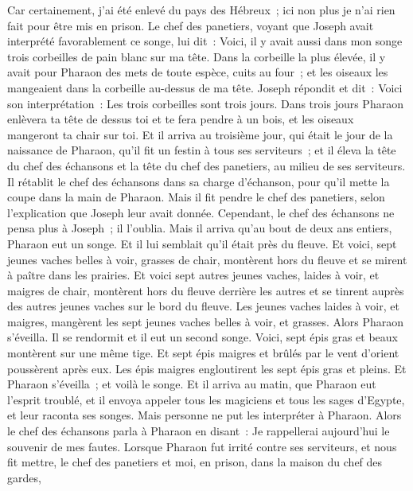 \begin{multicols}{2}
Car certainement, j'ai été enlevé du pays des Hébreux~; ici non plus je n'ai rien fait pour être mis en prison.
Le chef des panetiers, voyant que Joseph avait interprété favorablement ce songe, lui dit~: Voici, il y avait aussi dans mon songe trois corbeilles de pain blanc sur ma tête.
Dans la corbeille la plus élevée, il y avait pour Pharaon des mets de toute espèce, cuits au four~; et les oiseaux les mangeaient dans la corbeille au-dessus de ma tête.
Joseph répondit et dit~: Voici son interprétation~: Les trois corbeilles sont trois jours.
Dans trois jours Pharaon enlèvera ta tête de dessus toi et te fera pendre à un bois, et les oiseaux mangeront ta chair sur toi.
Et il arriva au troisième jour, qui était le jour de la naissance de Pharaon, qu'il fit un festin à tous ses serviteurs~; et il éleva la tête du chef des échansons et la tête du chef des panetiers, au milieu de ses serviteurs.
Il rétablit le chef des échansons dans sa charge d'échanson, pour qu'il mette la coupe dans la main de Pharaon.
Mais il fit pendre le chef des panetiers, selon l'explication que Joseph leur avait donnée.
Cependant, le chef des échansons ne pensa plus à Joseph~; il l'oublia.
\VerseOne{}Mais il arriva qu'au bout de deux ans entiers, Pharaon eut un songe. Et il lui semblait qu'il était près du fleuve.
Et voici, sept jeunes vaches belles à voir, grasses de chair, montèrent hors du fleuve et se mirent à paître dans les prairies.
Et voici sept autres jeunes vaches, laides à voir, et maigres de chair, montèrent hors du fleuve derrière les autres et se tinrent auprès des autres jeunes vaches sur le bord du fleuve.
Les jeunes vaches laides à voir, et maigres, mangèrent les sept jeunes vaches belles à voir, et grasses. Alors Pharaon s'éveilla.
Il se rendormit et il eut un second songe. Voici, sept épis gras et beaux montèrent sur une même tige.
Et sept épis maigres et brûlés par le vent d'orient poussèrent après eux.
Les épis maigres engloutirent les sept épis gras et pleins. Et Pharaon s'éveilla~; et voilà le songe.
Et il arriva au matin, que Pharaon eut l'esprit troublé, et il envoya appeler tous les magiciens et tous les sages d'Egypte, et leur raconta ses songes. Mais personne ne put les interpréter à Pharaon.
Alors le chef des échansons parla à Pharaon en disant~: Je rappellerai aujourd'hui le souvenir de mes fautes.
Lorsque Pharaon fut irrité contre ses serviteurs, et nous fit mettre, le chef des panetiers et moi, en prison, dans la maison du chef des gardes,

\end{multicols}
